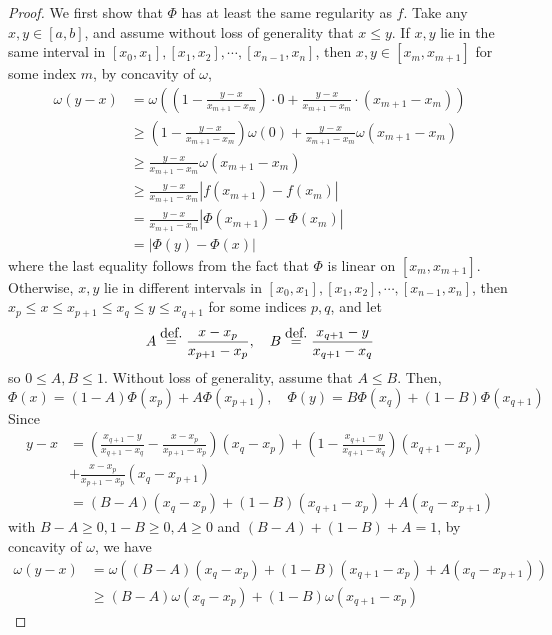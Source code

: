 \documentclass[10pt,a4paper]{amsart}
\newcommand{\eqdef}{\ensuremath{\stackrel{\mbox{\upshape\tiny def.}}{=}}}
\begin{document}
\begin{proof}

We first show that $\Phi$ has at least the same regularity as $f$. Take any $x,y\in[a,b]$, and assume without loss of generality that $x\le y$. If $x,y$ lie in the same interval in $[x_0,x_1],[x_1,x_2],\cdots,[x_{n-1},x_n]$, then $x,y\in[x_m,x_{m+1}]$ for some index $m$, by concavity of $\omega$, 
\begin{align*}
    \omega(y-x) 
    &= 
    \omega\left(
        \left( 1 - \frac{y-x}{x_{m+1}-x_m} \right) \cdot 0
        +
        \frac{y-x}{x_{m+1}-x_m} \cdot (x_{m+1}-x_m)
    \right)
    \\ 
    &\ge 
    \left( 1 - \frac{y-x}{x_{m+1}-x_m} \right) \omega(0)
    +
    \frac{y-x}{x_{m+1}-x_m} \omega(x_{m+1}-x_m)
    \\
    &\ge 
    \frac{y-x}{x_{m+1}-x_m} \omega(x_{m+1}-x_m)
    \\
    &\ge 
    \frac{y-x}{x_{m+1}-x_m} | f(x_{m+1}) - f(x_m) |
    \\
    &= 
    \frac{y-x}{x_{m+1}-x_m} | \Phi(x_{m+1}) - \Phi(x_m) |
    \\
    &=
    | \Phi(y) - \Phi(x) |
\end{align*}
where the last equality follows from the fact that $\Phi$ is linear on $[x_m,x_{m+1}]$. Otherwise, $x,y$ lie in different intervals in $[x_0,x_1],[x_1,x_2],\cdots,[x_{n-1},x_n]$, then $x_p \le x \le x_{p+1} \le x_q \le y \le x_{q+1}$ for some indices $p,q$, and let 
$$A \eqdef \frac{x-x_p}{x_{p+1}-x_p}, \quad
B \eqdef \frac{x_{q+1}-y}{x_{q+1}-x_q}$$
so $0 \le A,B \le 1$. Without loss of generality, assume that $A\le B$. Then, 
$$\Phi(x) = (1-A) \Phi(x_p) + A \Phi(x_{p+1}), \quad
  \Phi(y) = B \Phi(x_q) + (1-B) \Phi(x_{q+1})$$
Since 
\begin{align*}
    y-x
    &=
    \left(\frac{x_{q+1}-y}{x_{q+1}-x_q} - \frac{x-x_p}{x_{p+1}-x_p}\right)
    (x_q-x_p)
    + \left(1-\frac{x_{q+1}-y}{x_{q+1}-x_q}\right)
    (x_{q+1}-x_p)  \\
    &+ \frac{x-x_p}{x_{p+1}-x_p}(x_q - x_{p+1})  \\
    &= (B-A)(x_q-x_p) + (1-B)(x_{q+1}-x_p) + A(x_q - x_{p+1})
\end{align*}
with $B-A\ge 0, 1-B\ge 0, A\ge 0$ and $(B-A)+(1-B)+A=1$, by concavity of $\omega$, we have 
\begin{align*}
    \omega(y-x) 
    &= \omega( (B-A)(x_q-x_p) + (1-B)(x_{q+1}-x_p) + A(x_q - x_{p+1}) )  \\
    &\ge (B-A) \omega(x_q-x_p)
    + (1-B) \omega (x_{q+1}-x_p)

\end{align*}
\end{proof}
\end{document}
